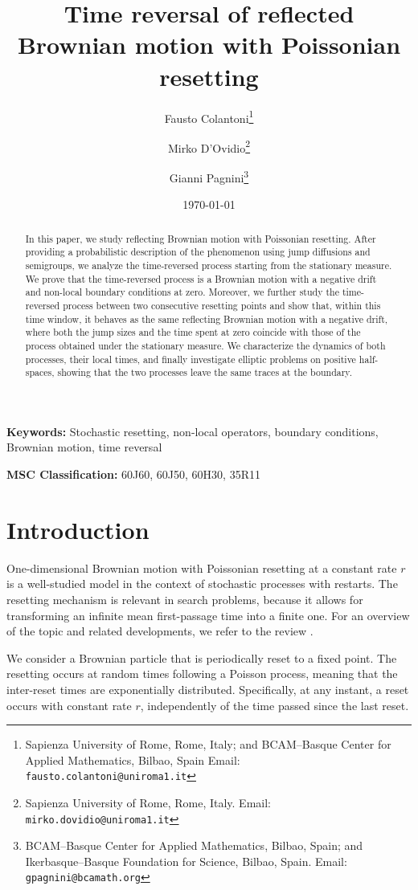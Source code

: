 \documentclass[11pt,a4paper]{article}
\title{Time reversal of reflected Brownian motion with Poissonian resetting}
\author{
	Fausto Colantoni\thanks{Sapienza University of Rome, Rome, Italy; and BCAM--Basque Center for Applied Mathematics, Bilbao, Spain Email: \texttt{fausto.colantoni@uniroma1.it}} \and
	Mirko D'Ovidio\thanks{Sapienza University of Rome, Rome, Italy. Email: \texttt{mirko.dovidio@uniroma1.it}} \and
	Gianni Pagnini\thanks{BCAM--Basque Center for Applied Mathematics, Bilbao, Spain; and Ikerbasque--Basque Foundation for Science, Bilbao, Spain. Email: \texttt{gpagnini@bcamath.org}}
}
\date{\today}
\theoremstyle{definition}
\theoremstyle{remark}
\begin{document}
	
	\maketitle
	
	\begin{abstract}
		In this paper, we study reflecting Brownian motion with Poissonian resetting. After providing a probabilistic description of the phenomenon using jump diffusions and semigroups, we analyze the time-reversed process starting from the stationary measure. We prove that the time-reversed process is a Brownian motion with a negative drift and non-local boundary conditions at zero. Moreover, we further study the time-reversed process between two consecutive resetting points and show that, within this time window, it behaves as the same reflecting Brownian motion with a negative drift, where both the jump sizes and the time spent at zero coincide with those of the process obtained under the stationary measure. We characterize the dynamics of both processes, their local times, and finally investigate elliptic problems on positive half-spaces, showing that the two processes leave the same traces at the boundary.
	\end{abstract}
	
	\bigskip
	
	\noindent
	\textbf{Keywords:} Stochastic resetting, non-local operators, boundary conditions, Brownian motion, time reversal
	
	\medskip
	
	\noindent
	\textbf{MSC Classification:} 60J60, 60J50, 60H30, 35R11
	
	\section{Introduction}
One-dimensional Brownian motion with Poissonian resetting at a constant rate \( r \) is a well-studied model in the context of stochastic processes with restarts. The resetting mechanism is relevant in search problems, because it allows for transforming an infinite mean first-passage time into a finite one. For an overview of the topic and related developments, we refer to the review \cite{evansreview}.


We consider a Brownian particle that is periodically reset to a fixed point. The resetting occurs at random times following a Poisson process, meaning that the inter-reset times are exponentially distributed. Specifically, at any instant, a reset occurs with constant rate \( r \), independently of the time passed since the last reset.  
\end{document}
